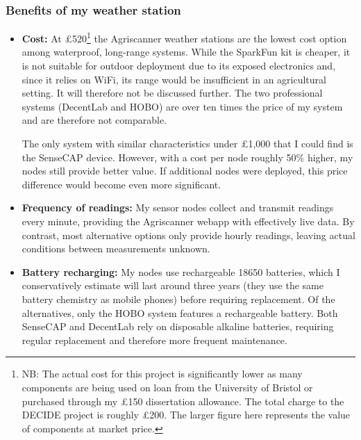 \subsubsection{Benefits of my weather station}

\begin{itemize}
  \item \textbf{Cost:} At £520\footnote{NB: The actual cost for this project is
        significantly lower as many components are being used on loan from the
        University of Bristol or purchased through my £150 dissertation
        allowance. The total charge to the DECIDE project is roughly £200. The
        larger figure here represents the value of components at market price.}
        the Agriscanner weather stations are the lowest cost option among
        waterproof, long-range systems. While the SparkFun kit is cheaper, it is
        not suitable for outdoor deployment due to its exposed electronics and,
        since it relies on WiFi, its range would be insufficient in an
        agricultural setting. It will therefore not be discussed further. The
        two professional systems (DecentLab and HOBO) are over ten times the
        price of my system and are therefore not comparable.

        The only system with similar characteristics under £1,000 that I could
        find is the SenseCAP device. However, with a cost per node roughly 50\%
        higher, my nodes still provide better value. If additional nodes were
        deployed, this price difference would become even more significant.

  \item \textbf{Frequency of readings:} My sensor nodes collect and transmit
        readings every minute, providing the Agriscanner webapp with effectively
        live data. By contrast, most alternative options only provide hourly
        readings, leaving actual conditions between measurements unknown.

  \item \textbf{Battery recharging:} My nodes use rechargeable 18650 batteries,
        which I conservatively estimate will last around three years (they use
        the same battery chemistry as mobile phones) before requiring
        replacement. Of the alternatives, only the HOBO system features a
        rechargeable battery. Both SenseCAP and DecentLab rely on disposable
        alkaline batteries, requiring regular replacement and therefore more
        frequent maintenance.


\end{itemize}
